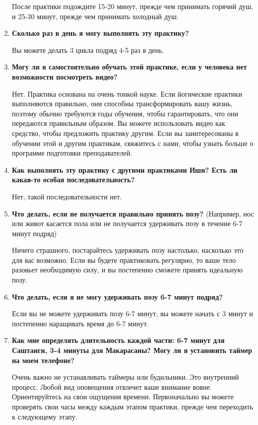 \documentclass[
a4paper, %
12pt, %
article,
onecolumn, %
openany, %
]{memoir}
\begin{document}
\begin{enumerate}
После практики подождите 15-20 минут, прежде чем принимать горячий душ, и 25-30
минут, прежде чем принимать холодный душ.

\item \textbf{Сколько раз в день я могу выполнять эту практику?}

Вы можете делать 3 цикла подряд 4-5 раз в день.
\item \textbf{Могу ли я самостоятельно обучать этой практике, если у человека нет возможности посмотреть видео?}

Нет. Практика основана на очень тонкой науке. Если йогические практики выполняются
правильно, они способны трансформировать вашу жизнь, поэтому обычно требуются
годы обучения, чтобы гарантировать, что они передаются правильным образом. Вы
можете использовать видео как средство, чтобы предложить практику другим. Если вы
заинтересованы в обучении этой и другим практикам, свяжитесь с нами, чтобы узнать
больше о программе подготовки преподавателей.
\item \textbf{Как выполнять эту практику с другими практиками Иши? Есть ли какая-то особая последовательность?}

Нет, такой последовательности нет.
\item \textbf{Что делать, если не получается правильно принять позу?}
(Например, нос или живот касается пола или не получается удерживать позу в течение
6-7 минут подряд)

Ничего страшного, постарайтесь удерживать позу настолько, насколько это для вас
возможно. Если вы будете практиковать регулярно, то ваше тело разовьет
необходимую силу, и вы постепенно сможете принять идеальную позу.

\item \textbf{Что делать, если я не могу удерживать позу 6-7 минут подряд?}

Если вы не можете удерживать позу 6-7 минут, вы можете начать с 3 минут и
постепенно наращивать время до 6-7 минут.





\item \textbf{Как мне определять длительность каждой части: 6-7 минут для Саштанги, 3-4 минуты для Макарасаны? Могу ли я установить таймер на моем телефоне?}

Очень важно не устанавливать таймеры или будильники. Это внутренний процесс.
Любой вид оповещения отвлечет ваше внимание вовне. Ориентируйтесь на свои ощущения времени. Первоначально вы можете проверять свои часы между каждым этапом практики, прежде чем переходить к следующему этапу.


\end{enumerate}
\end{document}

